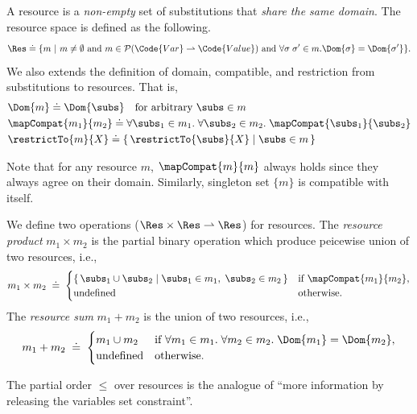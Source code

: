 \begin{definition}[Resource]\label{def:resource}
A resource is a \emph{non-empty} set of substitutions that \emph{share the same domain}. The resource space is defined as the following.
\begin{align*}
  \Res \doteq \{ m ~|~ m \neq \emptyset \text{ and } m \in \mathcal{P}(\Code{Var} \rightharpoonup \Code{Value}) \text{ and } \forall \sigma\;\sigma' \in m. \Dom{\sigma} = \Dom{\sigma'} \}.
\end{align*}
We also extends the definition of domain, compatible, and restriction from substitutions to resources. That is,
\begin{align*}
  &\Dom{m} \doteq  \Dom{\subs} \quad \text{for arbitrary } \subs \in m 
  \\&\mapCompat{m_1}{m_2}
  \doteq
  \forall \subs_1 \in m_1.\;\forall \subs_2 \in m_2.\; \mapCompat{\subs_1}{\subs_2}
  \\&\restrictTo{m}{X}
  \doteq
  \{\, \restrictTo{\subs}{X} \mid \subs \in m \,\}
\end{align*}
\end{definition}

Note that for any resource $m$, $\mapCompat{m}{m}$ always holds since they always agree on their domain. Similarly, singleton set $\{m\}$ is compatible with itself.

\begin{definition}\label{def:resource-times} We define two operations ($\Res \times \Res \rightharpoonup \Res$) for resources. The \emph{resource product} $m_1 \times m_2$ is the partial binary operation which produce peicewise union of two resources, i.e.,
  \[
    m_1 \times m_2 \;\doteq\;
    \begin{cases}
      \{\, \subs_1 \cup \subs_2 \mid \subs_1 \in m_1,\; \subs_2 \in m_2 \,\}
        & \text{if } \mapCompat{m_1}{m_2}, \\
      \text{undefined}
        & \text{otherwise.}
    \end{cases}
  \]
The \emph{resource sum} $m_1 + m_2$ is the union of two resources, i.e.,
\[
  m_1 + m_2 \;\doteq\;
  \begin{cases}
    m_1 \cup m_2
      & \text{if } \forall m_1 \in m_1.\; \forall m_2 \in m_2.\; \Dom{m_1} = \Dom{m_2}, \\
    \text{undefined}
      & \text{otherwise.}
  \end{cases}
\]
  \end{definition}

The partial order $\leq$ over resources is the analogue of ``more information by releasing the variables set constraint''.

